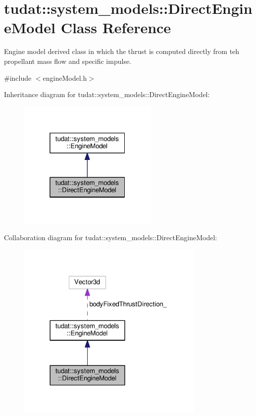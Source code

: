 \hypertarget{classtudat_1_1system__models_1_1DirectEngineModel}{}\section{tudat\+:\+:system\+\_\+models\+:\+:Direct\+Engine\+Model Class Reference}
\label{classtudat_1_1system__models_1_1DirectEngineModel}


Engine model derived class in which the thrust is computed directly from teh propellant mass flow and specific impulse.  




{\ttfamily \#include $<$engine\+Model.\+h$>$}



Inheritance diagram for tudat\+:\+:system\+\_\+models\+:\+:Direct\+Engine\+Model\+:
\nopagebreak
\begin{figure}[H]
\begin{center}
\leavevmode
\includegraphics[width=193pt]{classtudat_1_1system__models_1_1DirectEngineModel__inherit__graph}
\end{center}
\end{figure}


Collaboration diagram for tudat\+:\+:system\+\_\+models\+:\+:Direct\+Engine\+Model\+:
\nopagebreak
\begin{figure}[H]
\begin{center}
\leavevmode
\includegraphics[width=258pt]{classtudat_1_1system__models_1_1DirectEngineModel__coll__graph}
\end{center}
\end{figure}
